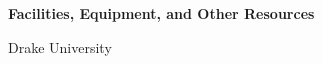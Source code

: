 \documentclass[11pt]{article}
\begin{document}
    \setcounter{page}{1}
    \begin{center}
        {\Large {\bf Facilities, Equipment, and Other Resources}}
    \end{center}

    \begin{center}
        {\Large Drake University}
    \end{center}


\end{document}
